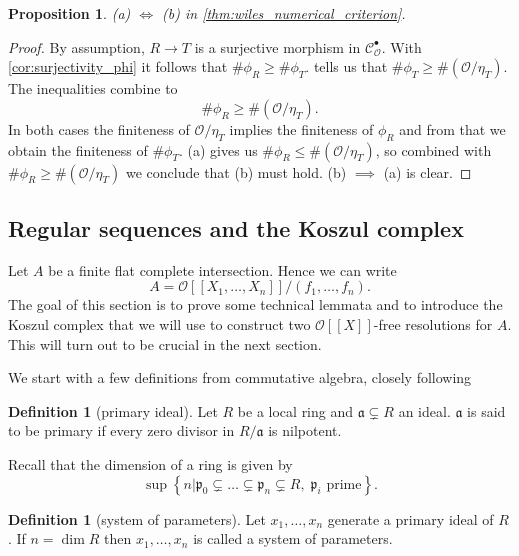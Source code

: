 \documentclass{article}
\theoremstyle{plain}%
\newtheorem{proposition}[theorem]{Proposition}
\theoremstyle{definition}
\newtheorem{definition}[theorem]{Definition}
\theoremstyle{remark}
\newcommand{\cob}{\mathcal{C}_\mathcal{O}^\bullet}
\begin{document}
\begin{proposition}\textup{\cite[cf.][corollary 5.6]{Darmon1995}}\label{prop:aequalsb}
    (a) \(\Leftrightarrow\) (b) in \cref{thm:wiles_numerical_criterion}.
\end{proposition}
\begin{proof}
    By assumption, \(R \to T\) is a surjective morphism in \(\cob\).
    With \cref{cor:surjectivity_phi} it follows that \(\#\phi_R \geq \#\phi_T\).  
    tells us that \(\#\phi_T \geq \#(\mathcal{O}/\eta_T)\).
    The inequalities combine to \[\#\phi_R \geq \#(\mathcal{O}/\eta_T).\]
    In both cases the finiteness of \(\mathcal{O}/\eta_T\) implies the finiteness of \(\phi_R\)
    and from that we obtain the finiteness of \(\#\phi_T\).
    (a) gives us \(\#\phi_R \leq \#(\mathcal{O}/\eta_T)\), so combined with \(\#\phi_R \geq \#(\mathcal{O}/\eta_T)\) 
    we conclude that (b) must hold. (b) \(\implies\) (a) is clear.
\end{proof}

\subsection{Regular sequences and the Koszul complex}
Let \(A\) be a finite flat complete intersection. Hence we can write 
\[A = \mathcal{O}[[X_1, \dots, X_n]]/(f_1, \dots, f_n).\]
The goal of this section is to prove some technical lemmata and to introduce
the Koszul complex that we will use to construct two \(\mathcal{O}[[X]]\)-free resolutions for \(A\).
This will turn out to be crucial in the next section.

We start with a few definitions from commutative algebra, closely following \cite[section 5.3]{Darmon1995}
\begin{definition}[primary ideal]
    Let \(R\) be a local ring and \(\mathfrak{a} \subsetneq R\) an ideal. 
    \(\mathfrak{a}\) is said to be primary if every zero divisor in \(R/\mathfrak{a}\) is nilpotent.
\end{definition}
Recall that the dimension of a ring is given by
\[
    \sup \left\{n | 
                \mathfrak{p}_0 \subsetneq \dots \subsetneq \mathfrak{p}_n \subsetneq R,\; \mathfrak{p}_i \text{ prime} 
        \right\}.
\]
\begin{definition}[system of parameters]
    Let \(x_1, \dots, x_n\) generate a primary ideal of \(R\). If \(n = \dim R\) then \(x_1, \dots, x_n\) is called 
    a system of parameters.
\end{definition}
\end{document}
